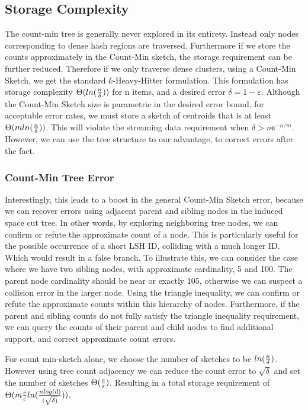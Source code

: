 \subsection{Storage Complexity}\label{twrperror}
The count-min tree is generally never explored in its entirety. Instead only nodes corresponding to
dense hash regions are traversed.  Furthermore if we store the counts approximately in the Count-Min 
sketch, the storage requirement can be further reduced.  Therefore
if we only traverse dense clusters, using a Count-Min Sketch, we get the standard $k$-Heavy-Hitter formulation.
This formulation has storage complexity $\Theta( ln({n\over \delta}))$ for n items, and a desired error 
$\delta = 1-\varepsilon$.  
Although the Count-Min Sketch size is parametric in the desired error bound, for 
acceptable error rates, we must store a sketch of centroids that is at least $\Theta( m ln({n\over \delta}))$.
This will violate the streaming data requirement when $\delta > n \mathbb{e}^{-n/m}$.
However, we can use the tree structure to our advantage, to correct errors after the fact.

\subsubsection{Count-Min Tree Error}

Interestingly, this leads to a boost in the general Count-Min Sketch error, because we can
recover errors using adjacent parent and sibling nodes in the induced space cut tree. In other words, 
by exploring neighboring tree nodes, we can confirm or refute the approximate count of a node. This
is particularly useful for the possible occurrence of a short LSH ID, colliding with a much longer
ID. Which would result in a false branch. To illustrate this, we can consider the case where we
have two sibling nodes, with approximate cardinality, 5 and 100. The parent node cardinality should
be near or exactly 105, otherwise we can suspect a collision error in the larger node. Using 
the triangle inequality, we can confirm or refute the approximate counts within this hierarchy of nodes.
Furthermore, if the parent and sibling counts do not fully satisfy the triangle inequality requirement,
we can query the counts of their parent and child nodes to find additional support, and correct approximate 
count errors.

For count min-sketch alone, we choose the number of sketches to be $ln({n\over \delta})$\cite{cormode2}. 
However using tree count adjacency we can reduce the count error to $\sqrt{\delta}$ and set the number of sketches
$\Theta({e \over \varepsilon})$. Resulting in a total storage requirement of 
$\Theta(m{e \over \varepsilon}ln({{nlog(d)}\over{(\sqrt{\delta)}}}))$.
 
